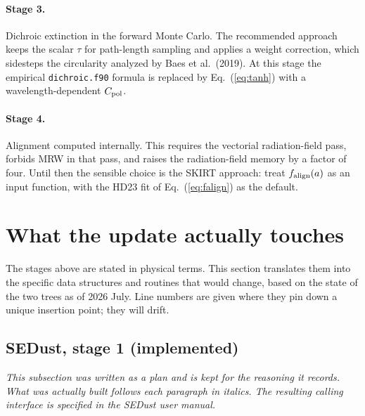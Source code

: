 \documentclass{my_memo}
\newcommand{\code}[1]{\texttt{#1}}
\newcommand{\Cpol}{\ensuremath{C_{\rm pol}}}
\newcommand{\falign}{\ensuremath{f_{\rm align}}}
\begin{document}
\paragraph{Stage 3.} Dichroic extinction in the forward Monte Carlo. The
recommended approach keeps the scalar $\tau$ for path-length sampling and
applies a weight correction, which sidesteps the circularity analyzed by
Baes et al.\ (2019). At this stage the empirical \code{dichroic.f90}
formula is replaced by Eq.~(\ref{eq:tanh}) with a wavelength-dependent
$\Cpol$.

\paragraph{Stage 4.} Alignment computed internally. This requires the
vectorial radiation-field pass, forbids MRW in that pass, and raises the
radiation-field memory by a factor of four. Until then the sensible
choice is the SKIRT approach: treat $\falign(a)$ as an input function,
with the HD23 fit of Eq.~(\ref{eq:falign}) as the default.

\section{What the update actually touches}
\label{sec:worklist}

The stages above are stated in physical terms. This section translates
them into the specific data structures and routines that would change,
based on the state of the two trees as of 2026 July. Line numbers are
given where they pin down a unique insertion point; they will drift.

\subsection{SEDust, stage 1 (implemented)}

\emph{This subsection was written as a plan and is kept for the reasoning
it records. What was actually built follows each paragraph in italics.
The resulting calling interface is specified in the SEDust user manual.}
\end{document}
